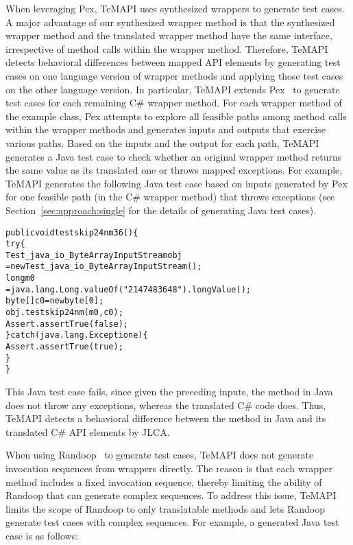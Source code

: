 When leveraging Pex, TeMAPI uses synthesized wrappers to generate test cases. A major advantage of our synthesized wrapper method is that the synthesized wrapper method and the translated wrapper method have the same interface, irrespective of method calls within the wrapper method. Therefore, TeMAPI detects behavioral differences between mapped API elements by generating test cases on one language version of wrapper methods and applying those test cases on the other language version. In particular, TeMAPI extends Pex~\citep{tillmann2008pex} to generate test cases for each remaining C\# wrapper method. For each wrapper method of the example class, Pex attempts to explore all feasible paths among method calls within the wrapper methods and generates inputs and outputs that exercise various paths. Based on the inputs and the output for each path, TeMAPI generates a Java test case to check whether an original wrapper method returns the same value as its translated one or throws mapped exceptions. For example, TeMAPI generates the following Java test case based on inputs generated by Pex for one feasible path (in the C\# wrapper method) that throws exceptions (see Section~\ref{sec:approach:single} for the details of generating Java test cases).

\begin{CodeOut}%
\begin{alltt}
public void testskip24nm36()\{
  try\{
     Test_java_io_ByteArrayInputStream obj
      = new Test_java_io_ByteArrayInputStream();
     long m0
      = java.lang.Long.valueOf("2147483648").longValue();
     byte[] c0 = new byte[0];
     obj.testskip24nm(m0,c0);
     Assert.assertTrue(false);
  \}catch(java.lang.Exception e)\{
     Assert.assertTrue(true);
  \}
\}
\end{alltt}
\end{CodeOut}%

This Java test case fails, since given the preceding inputs, the  method in Java does not throw any exceptions, whereas the translated C\# code does. Thus, TeMAPI detects a behavioral difference between the  method in Java and its translated C\# API elements by JLCA.

When using Randoop~\citep{pacheco2007feedback} to generate test cases, TeMAPI does not generate invocation sequences from wrappers directly. The reason is that each wrapper method includes a fixed invocation sequence, thereby limiting the ability of Randoop that can generate complex sequences. To address this issue, TeMAPI limits the scope of Randoop to only translatable methods and lets Randoop generate test cases with complex sequences. For example, a generated Java test case is as follows:


